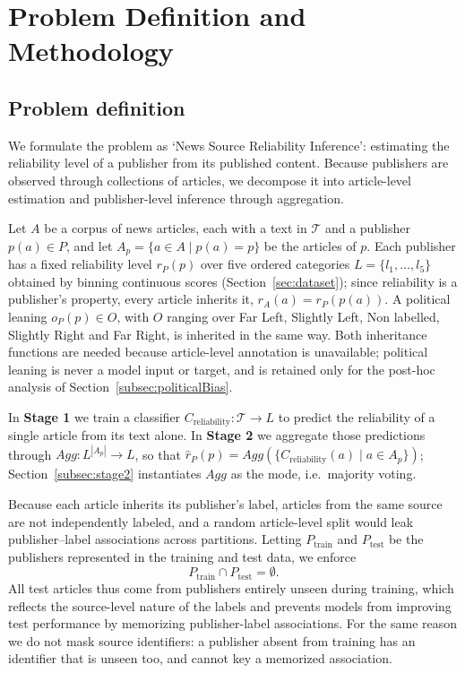 \documentclass[runningheads]{llncs}
\begin{document}
\section{Problem Definition and Methodology}
\label{sec:problemDef}

\subsection{Problem definition}\label{subsec:problemdef}
We formulate the problem as `News Source Reliability Inference': estimating the reliability level of a publisher from its published content. Because publishers are observed through collections of articles, we decompose it into article-level estimation and publisher-level inference through aggregation.

Let \(A\) be a corpus of news articles, each with a text in \(\mathcal{T}\) and a publisher \(p(a) \in P\), and let \(A_p = \{a \in A \mid p(a) = p\}\) be the articles of \(p\). Each publisher has a fixed reliability level \(r_P(p)\) over five ordered categories \(L = \{l_1, \ldots, l_5\}\) obtained by binning continuous scores (Section~\ref{sec:dataset}); since reliability is a publisher's property, every article inherits it, \(r_A(a) = r_P(p(a))\). A political leaning \(o_P(p) \in O\), with \(O\) ranging over Far Left, Slightly Left, Non labelled, Slightly Right and Far Right, is inherited in the same way. Both inheritance functions are needed because article-level annotation is unavailable; political leaning is never a model input or target, and is retained only for the post-hoc analysis of Section~\ref{subsec:politicalBias}.

In \textbf{Stage 1} we train a classifier \(C_{\text{reliability}}: \mathcal{T} \rightarrow L\) to predict the reliability of a single article from its text alone. In \textbf{Stage 2} we aggregate those predictions through \(Agg: L^{|A_{p}|} \rightarrow L\), so that \(\hat{r}_P(p) = Agg(\{ C_{\text{reliability}}(a) \mid a \in A_p \})\); Section~\ref{subsec:stage2} instantiates \(Agg\) as the mode, i.e.\ majority voting.

Because each article inherits its publisher's label, articles from the same source are not independently labeled, and a random article-level split would leak publisher--label associations across partitions. Letting \(P_{\text{train}}\) and \(P_{\text{test}}\) be the publishers represented in the training and test data, we enforce
\begin{equation}\label{eq:publisher_disjoint}
P_{\text{train}} \cap P_{\text{test}} = \emptyset .
\end{equation}
All test articles thus come from publishers entirely unseen during training, which reflects the source-level nature of the labels and prevents models from improving test performance by memorizing publisher-label associations. For the same reason we do not mask source identifiers: a publisher absent from training has an identifier that is unseen too, and cannot key a memorized association.
\end{document}
